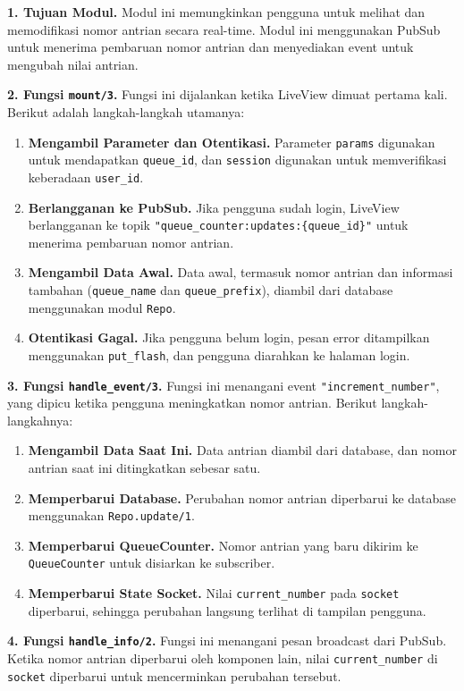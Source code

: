 \textbf{1. Tujuan Modul.} Modul ini memungkinkan pengguna untuk melihat dan memodifikasi nomor antrian secara real-time. Modul ini menggunakan PubSub untuk menerima pembaruan nomor antrian dan menyediakan event untuk mengubah nilai antrian.

\textbf{2. Fungsi \texttt{mount/3}.} Fungsi ini dijalankan ketika LiveView dimuat pertama kali. Berikut adalah langkah-langkah utamanya:
\begin{enumerate}
	\item \textbf{Mengambil Parameter dan Otentikasi.} Parameter \texttt{params} digunakan untuk mendapatkan \texttt{queue\_id}, dan \texttt{session} digunakan untuk memverifikasi keberadaan \texttt{user\_id}.
	\item \textbf{Berlangganan ke PubSub.} Jika pengguna sudah login, LiveView berlangganan ke topik \texttt{"queue\_counter:updates:\{queue\_id\}"} untuk menerima pembaruan nomor antrian.
	\item \textbf{Mengambil Data Awal.} Data awal, termasuk nomor antrian dan informasi tambahan (\texttt{queue\_name} dan \texttt{queue\_prefix}), diambil dari database menggunakan modul \texttt{Repo}.
	\item \textbf{Otentikasi Gagal.} Jika pengguna belum login, pesan error ditampilkan menggunakan \texttt{put\_flash}, dan pengguna diarahkan ke halaman login.
\end{enumerate}

\textbf{3. Fungsi \texttt{handle\_event/3}.} Fungsi ini menangani event \texttt{"increment\_number"}, yang dipicu ketika pengguna meningkatkan nomor antrian. Berikut langkah-langkahnya:
\begin{enumerate}
	\item \textbf{Mengambil Data Saat Ini.} Data antrian diambil dari database, dan nomor antrian saat ini ditingkatkan sebesar satu.
	\item \textbf{Memperbarui Database.} Perubahan nomor antrian diperbarui ke database menggunakan \texttt{Repo.update/1}.
	\item \textbf{Memperbarui QueueCounter.} Nomor antrian yang baru dikirim ke \texttt{QueueCounter} untuk disiarkan ke subscriber.
	\item \textbf{Memperbarui State Socket.} Nilai \texttt{current\_number} pada \texttt{socket} diperbarui, sehingga perubahan langsung terlihat di tampilan pengguna.
\end{enumerate}

\textbf{4. Fungsi \texttt{handle\_info/2}.} Fungsi ini menangani pesan broadcast dari PubSub. Ketika nomor antrian diperbarui oleh komponen lain, nilai \texttt{current\_number} di \texttt{socket} diperbarui untuk mencerminkan perubahan tersebut.

